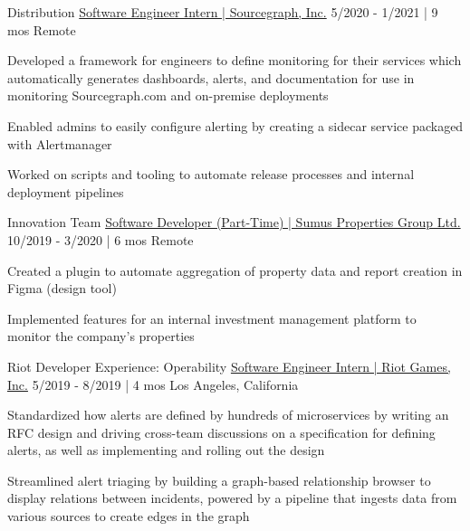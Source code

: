 \begin{cventries}
  \cventry
    {Distribution}
    {\href{https://bobheadxi.dev/experience/sourcegraph-intern}{Software Engineer Intern | Sourcegraph, Inc.}} %
    {5/2020 - 1/2021 | 9 mos} %
    {Remote} %
    {
      \begin{cvitems} %
        \item {Developed a framework for engineers to define monitoring for their services which automatically generates dashboards, alerts, and documentation for use in monitoring Sourcegraph.com and on-premise deployments}
        \item {Enabled admins to easily configure alerting by creating a sidecar service packaged with Alertmanager}
        \item {Worked on scripts and tooling to automate release processes and internal deployment pipelines}
      \end{cvitems}
    }

  \cventry
    {Innovation Team}
    {\href{https://bobheadxi.dev/experience/sumus}{Software Developer (Part-Time) | Sumus Properties Group Ltd.}} %
    {10/2019 - 3/2020 | 6 mos} %
    {Remote} %
    {
      \begin{cvitems} %
        \item {Created a plugin to automate aggregation of property data and report creation in Figma (design tool)}
        \item {Implemented features for an internal investment management platform to monitor the company's properties}
      \end{cvitems}
    }


  \cventry
    {Riot Developer Experience: Operability}
    {\href{https://bobheadxi.dev/experience/riot-games}{Software Engineer Intern | Riot Games, Inc.}} %
    {5/2019 - 8/2019 | 4 mos} %
    {Los Angeles, California} %
    {
      \begin{cvitems} %
        \item {Standardized how alerts are defined by hundreds of microservices by writing an RFC design and driving cross-team discussions on a specification for defining alerts, as well as implementing and rolling out the design}
        \item {Streamlined alert triaging by building a graph-based relationship browser to display relations between incidents, powered by a pipeline that ingests data from various sources to create edges in the graph}
      \end{cvitems}
    }


\end{cventries}
